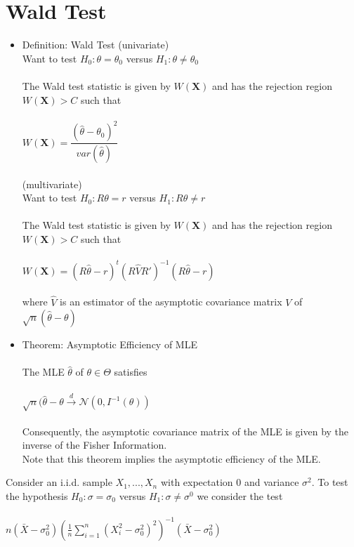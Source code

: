 \documentclass{article}
\begin{document}
\section{Wald Test}
\begin{itemize}
    \item Definition: Wald Test
    (univariate)\\
    Want to test $H_0: \theta=\theta_0$ versus $H_1: \theta\neq\theta_0$\\\\
    The Wald test statistic is given by $W(\textbf{X})$ and has the rejection region $W(\textbf{X})>C$ such that\\\\
    $W(\textbf{X})=\dfrac{(\hat{\theta}-\theta_0)^2}{var(\hat{\theta})}$\\\\
    (multivariate)\\
    Want to test $H_0:R\theta=r$ versus $H_1:R\theta\neq r$\\\\
    The Wald test statistic is given by $W(\textbf{X})$ and has the rejection region $W(\textbf{X})>C$ such that\\\\
    $W(\textbf{X})=(R\hat{\theta}-r)^t(R\hat{V}R')^{-1}(R\hat{\theta}-r)$\\\\
    where $\hat{V}$ is an estimator of the asymptotic covariance matrix $V$ of $\sqrt{n}(\hat{\theta}-\theta)$
    \item Theorem: Asymptotic Efficiency of MLE\\\\
    The MLE $\hat{\theta}$ of $\theta\in\Theta$ satisfies\\\\
    $\sqrt{n}(\hat{\theta}-\theta\xrightarrow{d}\mathcal{N}(0,I^{-1}(\theta))$\\\\
    Consequently, the asymptotic covariance matrix of the MLE is given by the inverse of the Fisher Information.\\
    Note that this theorem implies the asymptotic efficiency of the MLE.
\end{itemize}
Consider an i.i.d. sample $X_1,...,X_n$ with expectation 0 and variance $\sigma^2$.  To test the hypothesis $H_0:\sigma=\sigma_0$ versus $H_1: \sigma\neq\sigma^0$ we consider the test\\\\
$n(\bar{X}-\sigma_0^2)(\frac{1}{n}\sum_{i=1}^n(X_i^2-\sigma_0^2)^2)^{-1}(\bar{X}-\sigma_0^2)$\\\\
\end{document}
